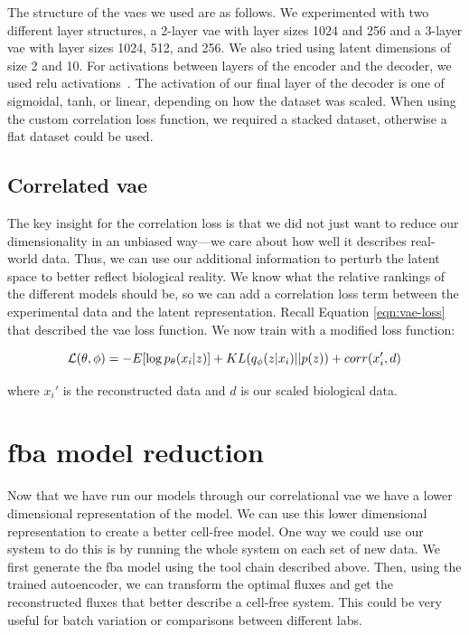 The structure of the \glspl{vae} we used are as follows.
We experimented with two different layer structures, a 2-layer \gls{vae} with layer sizes 1024 and 256 and a 3-layer \gls{vae} with layer sizes 1024, 512, and 256.
We also tried using latent dimensions of size 2 and 10.
For activations between layers of the encoder and the decoder, we used \gls{relu} activations~\cite{nair2010rectified}.
The activation of our final layer of the decoder is one of sigmoidal, tanh, or linear, depending on how the dataset was scaled.
When using the custom correlation loss function, we required a stacked dataset, otherwise a flat dataset could be used.

\subsection{Correlated \gls{vae}}
The key insight for the correlation loss is that we did not just want to reduce our dimensionality in an unbiased way---we care about how well it describes real-world data.
Thus, we can use our additional information to perturb the latent space to better reflect biological reality.
We know what the relative rankings of the different models should be, so we can add a correlation loss term between the experimental data and the latent representation.
Recall Equation \ref{eqn:vae-loss} that described the \gls{vae} loss function.
We now train with a modified loss function:


\begin{equation}\label{eqn:corr-loss}
\mathcal{L}(\theta, \phi) = - E[\log p_{\theta}(x_i | z)] + KL(q_{\phi}(z | x_i) || p(z)) + corr(x_i', d)\\
\end{equation}

where $x_i'$ is the reconstructed data and $d$ is our scaled biological data.

\section{\gls{fba} model reduction}
Now that we have run our models through our correlational \gls{vae} we have a lower dimensional representation of the model.
We can use this lower dimensional representation to create a better cell-free model.
One way we could use our system to do this is by running the whole system on each set of new data.
We first generate the \gls{fba} model using the tool chain described above.
Then, using the trained autoencoder, we can transform the optimal fluxes and get the reconstructed fluxes that better describe a cell-free system.
This could be very useful for batch variation or comparisons between different labs.

